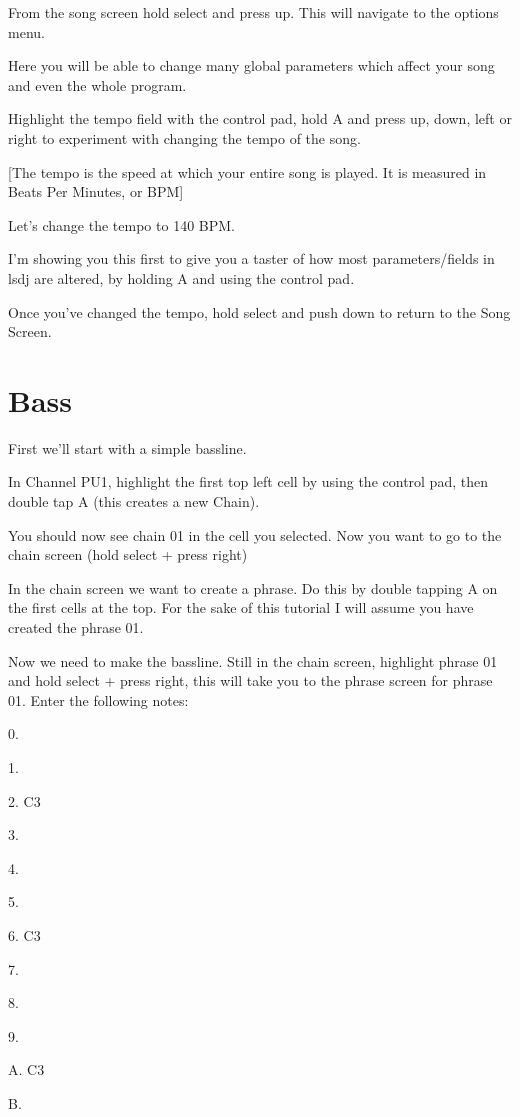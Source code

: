 \documentclass[]{article}
\begin{document}
From the song screen hold select and press up. This will navigate to the options menu.

Here you will be able to change many global parameters which affect your song and even the whole program.

Highlight the tempo field with the control pad, hold A and press up, down, left or right to experiment with changing the tempo of the song.

[The tempo is the speed at which your entire song is played. It is measured in Beats Per Minutes, or BPM]

Let's change the tempo to 140 BPM.

I'm showing you this first to give you a taster of how most parameters/fields in lsdj are altered, by holding A and using the control pad.

Once you've changed the tempo, hold select and push down to return to the Song Screen.

\section{Bass}

First we’ll start with a simple bassline.

In Channel PU1, highlight the first top left cell by using the control pad, then double tap A (this creates a new Chain).

You should now see chain 01 in the cell you selected. Now you want to go to the chain screen (hold select + press right)

In the chain screen we want to create a phrase. Do this by double tapping A on the first cells at the top. For the sake of this tutorial I will assume you have created the phrase 01.

Now we need to make the bassline. Still in the chain screen, highlight phrase 01 and hold select + press right, this will take you to the phrase screen for phrase 01. Enter the following notes:

0.

1.

2. C3

3.

4.

5.

6. C3

7.

8.

9.

A. C3

B.
\end{document}
